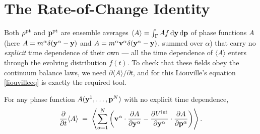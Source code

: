 \section{The Rate-of-Change Identity}

Both $\rho^{\rm pt}$ and $\mathbf{p}^{\rm pt}$ are ensemble averages $\langle A\rangle=\int_\Gamma A f\,\mathrm{d}\mathbf{y}\,\mathrm{d}\mathbf{p}$ of phase functions $A$ (here $A=m^\alpha\delta(\mathbf{y}^\alpha-\mathbf{y})$ and $A=m^\alpha\mathbf{v}^\alpha\delta(\mathbf{y}^\alpha-\mathbf{y})$, summed over $\alpha$) that carry no \textit{explicit} time dependence of their own --- all the time dependence of $\langle A\rangle$ enters through the evolving distribution $f(t)$. To check that these fields obey the continuum balance laws, we need $\partial\langle A\rangle/\partial t$, and for this Liouville's equation \eqref{liouvilleeq} is exactly the required tool.

\begin{theorem}\label{thm:rateofchange}
	For any phase function $A(\mathbf{y}^1,\ldots,\mathbf{p}^N)$ with no explicit time dependence,
	\begin{equation}\label{rateofchange}
		\frac{\partial}{\partial t}\langle A\rangle \;=\; \left\langle \sum_{\alpha=1}^N\left(\mathbf{v}^\alpha\cdot\frac{\partial A}{\partial\mathbf{y}^\alpha} - \frac{\partial V^{\rm int}}{\partial\mathbf{y}^\alpha}\cdot\frac{\partial A}{\partial\mathbf{p}^\alpha}\right)\right\rangle.
	\end{equation}
\end{theorem}

